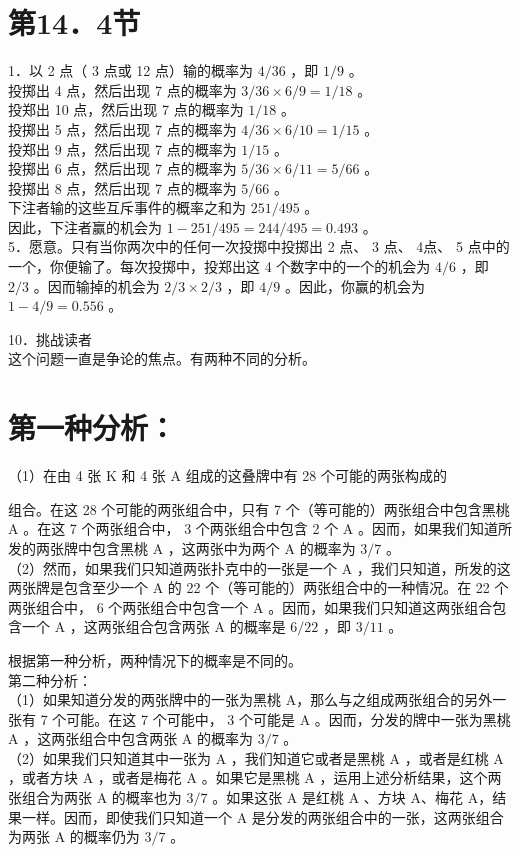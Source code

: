 \section*{第14．4节}
1．以 2 点（ 3 点或 12 点）输的概率为 $4 / 36$ ，即 $1 / 9$ 。\\
投掷出 4 点，然后出现 7 点的概率为 $3 / 36 \times 6 / 9=1 / 18$ 。\\
投郑出 10 点，然后出现 7 点的概率为 $1 / 18$ 。\\
投掷出 5 点，然后出现 7 点的概率为 $4 / 36 \times 6 / 10=1 / 15$ 。\\
投郑出 9 点，然后出现 7 点的概率为 $1 / 15$ 。\\
投掷出 6 点，然后出现 7 点的概率为 $5 / 36 \times 6 / 11=5 / 66$ 。\\
投掷出 8 点，然后出现 7 点的概率为 $5 / 66$ 。\\
下注者输的这些互斥事件的概率之和为 $251 / 495$ 。\\
因此，下注者赢的机会为 $1-251 / 495=244 / 495=0.493$ 。\\
5．愿意。只有当你两次中的任何一次投掷中投掷出 2 点、 3 点、 4点、 5 点中的一个，你便输了。每次投掷中，投郑出这 4 个数字中的一个的机会为 $4 / 6$ ，即 $2 / 3$ 。因而输掉的机会为 $2 / 3 \times 2 / 3$ ，即 $4 / 9$ 。因此，你赢的机会为 $1-4 / 9=0.556$ 。

10．挑战读者\\
这个问题一直是争论的焦点。有两种不同的分析。

\section*{第一种分析：}
（1）在由 4 张 K 和 4 张 A 组成的这叠牌中有 28 个可能的两张构成的

组合。在这 28 个可能的两张组合中，只有 7 个（等可能的）两张组合中包含黑桃 A 。在这 7 个两张组合中， 3 个两张组合中包含 2 个 A 。因而，如果我们知道所发的两张牌中包含黑桃 A ，这两张中为两个 A 的概率为 $3 / 7$ 。\\
（2）然而，如果我们只知道两张扑克中的一张是一个 A ，我们只知道，所发的这两张牌是包含至少一个 A 的 22 个（等可能的）两张组合中的一种情况。在 22 个两张组合中， 6 个两张组合中包含一个 A 。因而，如果我们只知道这两张组合包含一个 A ，这两张组合包含两张 A 的概率是 $6 / 22$ ，即 $3 / 11$ 。

根据第一种分析，两种情况下的概率是不同的。\\
第二种分析：\\
（1）如果知道分发的两张牌中的一张为黑桃 A，那么与之组成两张组合的另外一张有 7 个可能。在这 7 个可能中， 3 个可能是 A 。因而，分发的牌中一张为黑桃 A ，这两张组合中包含两张 A 的概率为 $3 / 7$ 。\\
（2）如果我们只知道其中一张为 A ，我们知道它或者是黑桃 A ，或者是红桃 A ，或者方块 A ，或者是梅花 A 。如果它是黑桃 A ，运用上述分析结果，这个两张组合为两张 A 的概率也为 $3 / 7$ 。如果这张 A 是红桃 A 、方块 A、梅花 A，结果一样。因而，即使我们只知道一个 A 是分发的两张组合中的一张，这两张组合为两张 A 的概率仍为 $3 / 7$ 。


